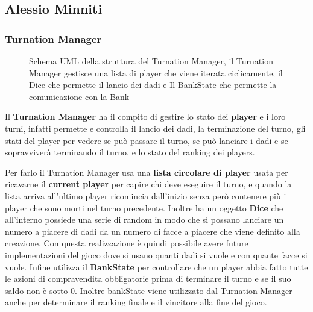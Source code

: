 \subsection{Alessio Minniti}
\subsubsection{Turnation Manager}
\begin{figure}[H]
    \centering
    \caption{Schema UML della struttura del Turnation Manager, il Turnation Manager gestisce una lista di player che viene iterata ciclicamente, 
    il Dice che permette il lancio dei dadi e Il BankState che permette la comunicazione con la Bank }
	\label{img:Turnation}
\end{figure}

Il \textbf{Turnation Manager} ha il compito di gestire lo stato dei \textbf{player} e i loro turni, 
infatti permette e controlla il lancio dei dadi, la terminazione del turno, gli stati del player per vedere se può passare il turno, 
se può lanciare i dadi e se sopravviverà terminando il turno, e lo stato del ranking dei players.\newline

Per farlo il Turnation Manager usa una \textbf{lista circolare di player} usata per ricavarne il \textbf{current player} per capire chi deve eseguire il turno, e
quando la lista arriva all'ultimo player ricomincia dall'inizio senza però contenere più i player che sono morti nel turno precedente.\newline
Inoltre ha un oggetto \textbf{Dice} che all'interno possiede una serie di random in modo che si possano lanciare 
un numero a piacere di dadi da un numero di facce a piacere che viene definito alla creazione. Con questa realizzazione è quindi possibile avere future implementazioni del gioco
dove si usano quanti dadi si vuole e con quante facce si vuole.\newline
Infine utilizza il \textbf{BankState} per controllare che un player abbia fatto tutte le azioni di compravendita obbligatorie prima di terminare il turno e se il suo saldo non è sotto 0.
Inoltre bankState viene utilizzato dal Turnation Manager anche per determinare il ranking finale e il vincitore alla fine del gioco.

